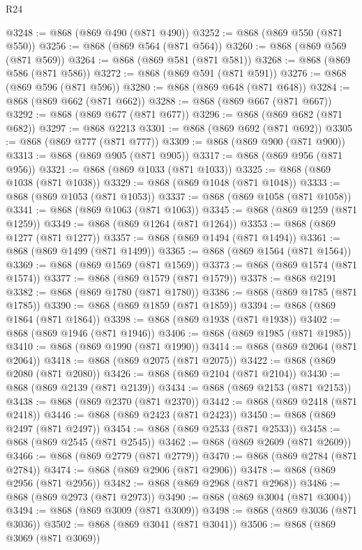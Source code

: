 \begin{lexlean}{R24}
\begin{coremodule}
{{{{{{{{{{{{{{{{{{{{{{{{{{{{{{{{{{{{{{{{{{{{{{{{{{{{{{{{{{{{{{{{{{{{{{{{{{{{{{{{{{{{{{{{{{{{{{{{{{{{{{{{{{{{{{{{{{{{{{{{{{{{{{{{{{{{{{{{{{{{{{{{{{{{{{{{{{{{{{{{{{{{{{{{{{{{{{{{{{{{{{{{{{{{{{{{{{{@3248 := @868 (@869 @490 (@871 @490))
@3252 := @868 (@869 @550 (@871 @550))
@3256 := @868 (@869 @564 (@871 @564))
@3260 := @868 (@869 @569 (@871 @569))
@3264 := @868 (@869 @581 (@871 @581))
@3268 := @868 (@869 @586 (@871 @586))
@3272 := @868 (@869 @591 (@871 @591))
@3276 := @868 (@869 @596 (@871 @596))
@3280 := @868 (@869 @648 (@871 @648))
@3284 := @868 (@869 @662 (@871 @662))
@3288 := @868 (@869 @667 (@871 @667))
@3292 := @868 (@869 @677 (@871 @677))
@3296 := @868 (@869 @682 (@871 @682))
@3297 := @868 @2213
@3301 := @868 (@869 @692 (@871 @692))
@3305 := @868 (@869 @777 (@871 @777))
@3309 := @868 (@869 @900 (@871 @900))
@3313 := @868 (@869 @905 (@871 @905))
@3317 := @868 (@869 @956 (@871 @956))
@3321 := @868 (@869 @1033 (@871 @1033))
@3325 := @868 (@869 @1038 (@871 @1038))
@3329 := @868 (@869 @1048 (@871 @1048))
@3333 := @868 (@869 @1053 (@871 @1053))
@3337 := @868 (@869 @1058 (@871 @1058))
@3341 := @868 (@869 @1063 (@871 @1063))
@3345 := @868 (@869 @1259 (@871 @1259))
@3349 := @868 (@869 @1264 (@871 @1264))
@3353 := @868 (@869 @1277 (@871 @1277))
@3357 := @868 (@869 @1494 (@871 @1494))
@3361 := @868 (@869 @1499 (@871 @1499))
@3365 := @868 (@869 @1564 (@871 @1564))
@3369 := @868 (@869 @1569 (@871 @1569))
@3373 := @868 (@869 @1574 (@871 @1574))
@3377 := @868 (@869 @1579 (@871 @1579))
@3378 := @868 @2191
@3382 := @868 (@869 @1780 (@871 @1780))
@3386 := @868 (@869 @1785 (@871 @1785))
@3390 := @868 (@869 @1859 (@871 @1859))
@3394 := @868 (@869 @1864 (@871 @1864))
@3398 := @868 (@869 @1938 (@871 @1938))
@3402 := @868 (@869 @1946 (@871 @1946))
@3406 := @868 (@869 @1985 (@871 @1985))
@3410 := @868 (@869 @1990 (@871 @1990))
@3414 := @868 (@869 @2064 (@871 @2064))
@3418 := @868 (@869 @2075 (@871 @2075))
@3422 := @868 (@869 @2080 (@871 @2080))
@3426 := @868 (@869 @2104 (@871 @2104))
@3430 := @868 (@869 @2139 (@871 @2139))
@3434 := @868 (@869 @2153 (@871 @2153))
@3438 := @868 (@869 @2370 (@871 @2370))
@3442 := @868 (@869 @2418 (@871 @2418))
@3446 := @868 (@869 @2423 (@871 @2423))
@3450 := @868 (@869 @2497 (@871 @2497))
@3454 := @868 (@869 @2533 (@871 @2533))
@3458 := @868 (@869 @2545 (@871 @2545))
@3462 := @868 (@869 @2609 (@871 @2609))
@3466 := @868 (@869 @2779 (@871 @2779))
@3470 := @868 (@869 @2784 (@871 @2784))
@3474 := @868 (@869 @2906 (@871 @2906))
@3478 := @868 (@869 @2956 (@871 @2956))
@3482 := @868 (@869 @2968 (@871 @2968))
@3486 := @868 (@869 @2973 (@871 @2973))
@3490 := @868 (@869 @3004 (@871 @3004))
@3494 := @868 (@869 @3009 (@871 @3009))
@3498 := @868 (@869 @3036 (@871 @3036))
@3502 := @868 (@869 @3041 (@871 @3041))
@3506 := @868 (@869 @3069 (@871 @3069))
}}}}}}}}}}}}}}}}}}}}}}}}}}}}}}}}}}}}}}}}}}}}}}}}}}}}}}}}}}}}}}}}}}}}}}}}}}}}}}}}}}}}}}}}}}}}}}}}}}}}}}}}}}}}}}}}}}}}}}}}}}}}}}}}}}}}}}}}}}}}}}}}}}}}}}}}}}}}}}}}}}}}}}}}}}}}}}}}}}}}}}}}}}}}}}}}}}}
\end{coremodule}
\end{lexlean}
